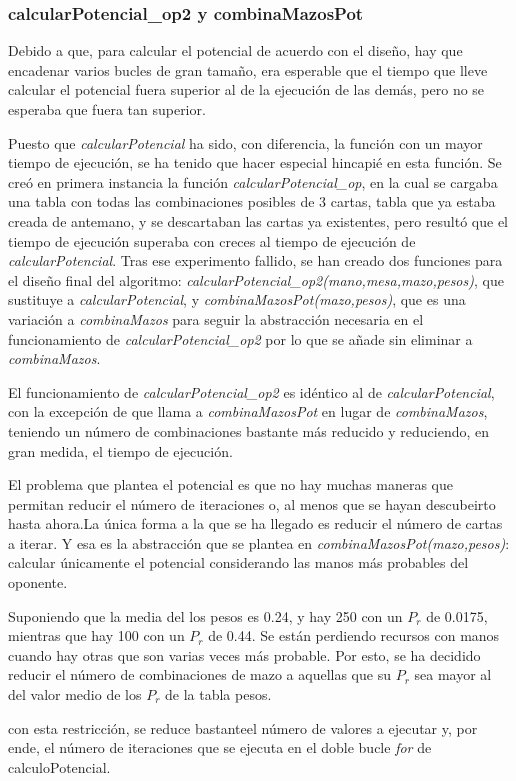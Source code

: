 \subsubsection{calcularPotencial\_op2 y combinaMazosPot}

Debido a que, para calcular el potencial de acuerdo con el diseño, hay que encadenar varios bucles de gran tamaño, era esperable que el tiempo que lleve calcular el potencial fuera superior al de la ejecución de las demás, pero no se esperaba que fuera tan superior.

Puesto que \textit{calcularPotencial} ha sido, con diferencia, la función con un mayor tiempo de ejecución, se ha tenido que hacer especial hincapié en esta función. Se creó en primera instancia la función \textit{calcularPotencial\_op}, en la cual se cargaba una tabla con todas las combinaciones posibles de 3 cartas, tabla que ya estaba creada de antemano, y se descartaban las cartas ya existentes, pero resultó que el tiempo de ejecución superaba con creces al tiempo de ejecución de \textit{calcularPotencial}. Tras ese experimento fallido, se han creado dos funciones para el diseño final del algoritmo: \textit{calcularPotencial\_op2(mano,mesa,mazo,pesos)}, que sustituye a \textit{calcularPotencial}, y \textit{combinaMazosPot(mazo,pesos)}, que es una variación a \textit{combinaMazos} para seguir la abstracción necesaria en el funcionamiento de  \textit{calcularPotencial\_op2} por lo que se añade sin eliminar a \textit{combinaMazos}.

El funcionamiento de \textit{calcularPotencial\_op2} es idéntico al de \textit{calcularPotencial}, con la excepción de que llama a \textit{combinaMazosPot} en lugar de \textit{combinaMazos}, teniendo un número de combinaciones bastante más reducido y reduciendo, en gran medida, el tiempo de ejecución.

El problema que plantea el potencial es que no hay muchas maneras que permitan reducir el número de iteraciones o, al menos que se hayan descubeirto hasta ahora.La única forma a la que se ha llegado es reducir el número de cartas a iterar. Y esa es la abstracción que se plantea en \textit{combinaMazosPot(mazo,pesos)}: calcular únicamente el potencial considerando las manos más probables del oponente.

Suponiendo que la media del los pesos es 0.24, y hay 250 con un $P_r$ de 0.0175, mientras que hay 100 con un $P_r$ de 0.44. Se están perdiendo recursos con manos cuando hay otras que son varias veces más probable. Por esto, se ha decidido reducir el número de combinaciones de mazo a aquellas que su $P_r$ sea mayor al del valor medio de los $P_r$ de la tabla pesos.

con esta restricción, se reduce bastanteel número de valores a ejecutar y, por ende, el número de iteraciones que se ejecuta en el doble bucle \textit{for} de calculoPotencial.